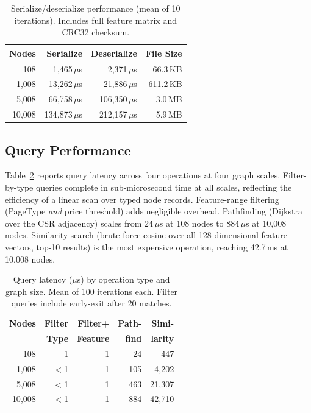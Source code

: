 \documentclass[10pt, twocolumn]{article}
\begin{document}
\begin{table}[t]
\caption{Serialize/deserialize performance (mean of 10 iterations). Includes full feature matrix and CRC32 checksum.}
\label{tab:serde}
\centering
\small
\begin{tabular}{@{}rrrr@{}}
\toprule
\textbf{Nodes} & \textbf{Serialize} & \textbf{Deserialize} & \textbf{File Size} \\
\midrule
108 & 1{,}465\,$\mu$s & 2{,}371\,$\mu$s & 66.3\,KB \\
1{,}008 & 13{,}262\,$\mu$s & 21{,}886\,$\mu$s & 611.2\,KB \\
5{,}008 & 66{,}758\,$\mu$s & 106{,}350\,$\mu$s & 3.0\,MB \\
10{,}008 & 134{,}873\,$\mu$s & 212{,}157\,$\mu$s & 5.9\,MB \\
\bottomrule
\end{tabular}
\end{table}

\subsection{Query Performance}
\label{sec:queryeval}

Table~\ref{tab:query} reports query latency across four operations at four graph scales. Filter-by-type queries complete in sub-microsecond time at all scales, reflecting the efficiency of a linear scan over typed node records. Feature-range filtering (PageType \emph{and} price threshold) adds negligible overhead. Pathfinding (Dijkstra over the CSR adjacency) scales from 24\,$\mu$s at 108 nodes to 884\,$\mu$s at 10{,}008 nodes. Similarity search (brute-force cosine over all 128-dimensional feature vectors, top-10 results) is the most expensive operation, reaching 42.7\,ms at 10{,}008 nodes.

\begin{table}[t]
\caption{Query latency ($\mu$s) by operation type and graph size. Mean of 100 iterations each. Filter queries include early-exit after 20 matches.}
\label{tab:query}
\centering
\small
\begin{tabular}{@{}rrrrr@{}}
\toprule
\textbf{Nodes} & \textbf{Filter} & \textbf{Filter+} & \textbf{Path-} & \textbf{Simi-} \\
 & \textbf{Type} & \textbf{Feature} & \textbf{find} & \textbf{larity} \\
\midrule
108 & 1 & 1 & 24 & 447 \\
1{,}008 & $<$1 & 1 & 105 & 4{,}202 \\
5{,}008 & $<$1 & 1 & 463 & 21{,}307 \\
10{,}008 & $<$1 & 1 & 884 & 42{,}710 \\
\bottomrule
\end{tabular}
\end{table}
\end{document}
